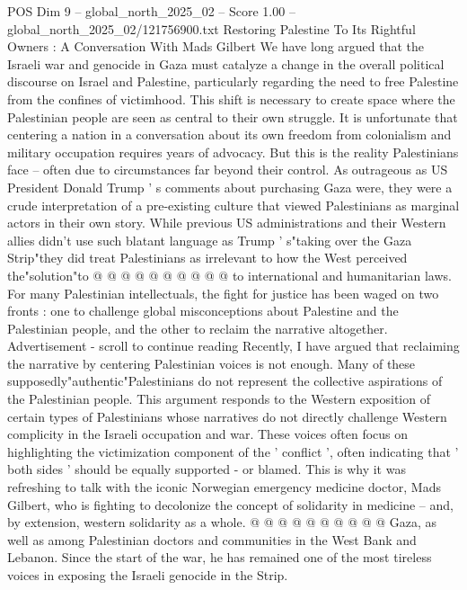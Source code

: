 \begin{textsample}{POS Dim 9 – global\_north\_2025\_02 – Score 1.00 – global\_north\_2025\_02/121756900.txt}  \label{ex:f9_pos_437}
Restoring Palestine To Its Rightful Owners : A Conversation With Mads Gilbert We have long argued that the Israeli war and genocide in Gaza must catalyze a change in the overall political discourse on Israel and Palestine, particularly regarding the need to free Palestine from the confines of victimhood.
This shift is necessary to create space where the Palestinian people are seen as central to their own struggle.
It is unfortunate that centering a nation in a conversation about its own freedom from colonialism and military occupation requires years of advocacy.
But this is the reality Palestinians face -- often due to circumstances far beyond their control.
As outrageous as US President Donald Trump ' s comments about purchasing Gaza were, they were a crude interpretation of a pre-existing culture that viewed Palestinians as marginal actors in their own story.
While previous US administrations and their Western allies didn't use such blatant language as Trump ' s"taking over the Gaza Strip"they did treat Palestinians as irrelevant to how the West perceived the"solution"to @ @ @ @ @ @ @ @ @ @ to international and humanitarian laws.
For many Palestinian intellectuals, the fight for justice has been waged on two fronts : one to challenge global misconceptions about Palestine and the Palestinian people, and the other to reclaim the narrative altogether.
Advertisement - scroll to continue reading Recently, I have argued that reclaiming the narrative by centering Palestinian voices is not enough.
Many of these supposedly"authentic"Palestinians do not represent the collective aspirations of the Palestinian people.
This argument responds to the Western exposition of certain types of Palestinians whose narratives do not directly challenge Western complicity in the Israeli occupation and war.
These voices often focus on highlighting the victimization component of the ' conflict ', often indicating that ' both sides ' should be equally supported - or blamed.
This is why it was refreshing to talk with the iconic Norwegian emergency medicine doctor, Mads Gilbert, who is fighting to decolonize the concept of solidarity in medicine -- and, by extension, western solidarity as a whole. @ @ @ @ @ @ @ @ @ @ Gaza, as well as among Palestinian doctors and communities in the West Bank and Lebanon.
Since the start of the war, he has remained one of the most tireless voices in exposing the Israeli genocide in the Strip.

\end{textsample}
